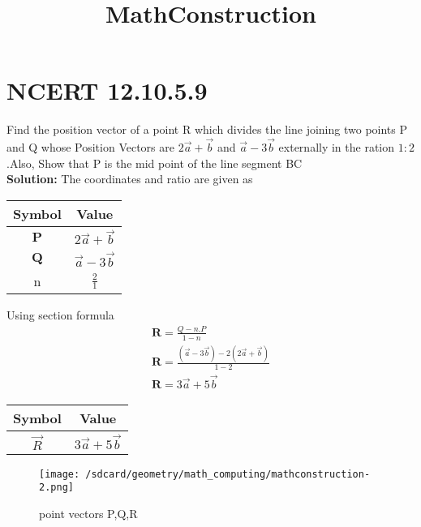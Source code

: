 \documentclass{article}
\title{MathConstruction}
\let\vec\mathbf
\begin{document}
\section{NCERT 12.10.5.9}

Find the position vector of a point R which divides the line joining two points P and Q whose Position Vectors are $2\overrightarrow{a}+\overrightarrow{b}$ and $\overrightarrow{a}-3\overrightarrow{b}$ externally in the ration $1:2$.Also, Show that P is the mid point of the line segment BC \\
\textbf{Solution:}
The coordinates and ratio are given as
\begin{table}[h]
    \centering
    \begin{tabular}{|c|c|}
        \hline
        \textbf{Symbol} & \textbf{Value} \\
        \hline
        $\vec{P}$ & $2\overrightarrow{a}+\overrightarrow{b}$ \\
        \hline
        $\vec{Q}$ & $\overrightarrow{a}-3\overrightarrow{b}$ \\
        \hline
        n & $\frac{2}{1}$ \\
        \hline
    \end{tabular}
    \label{tab:mytable}
\end{table}
Using section formula
\begin{align}
    \vec{R}=\frac{Q-n.P}{1-n}\\
    \vec{R}=\frac{(\overrightarrow{a}-3\overrightarrow{b})-2(2\overrightarrow{a}+\overrightarrow{b})}{1-2}\\
    \vec{R}=3\overrightarrow{a}+5\overrightarrow{b}
\end{align}
\begin{table}[h]
    \centering
    \begin{tabular}{|c|c|}
        \hline
        \textbf{Symbol} & \textbf{Value}  \\
        \hline
        $\Vec{R}$ & $3\overrightarrow{a}+5\overrightarrow{b}$  \\
        \hline
    \end{tabular}
    \label{tab:mytable}
\end{table}
\begin{figure}[!ht]
    \centering
    \texttt{[image: /sdcard/geometry/math\_computing/mathconstruction-2.png]}
    \caption{point vectors P,Q,R}
    \label{fig:enter-label}
\end{figure}
\end{document}
